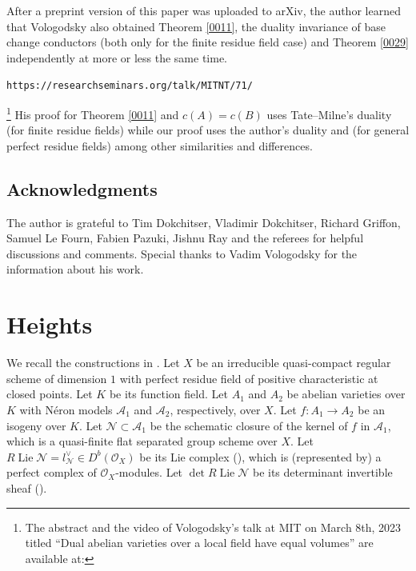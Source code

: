 \documentclass{amsart}
\theoremstyle{remark}
\numberwithin{equation}{section}
\newcommand{\Order}{\mathcal{O}}
\DeclareMathOperator{\Lie}{Lie}
\begin{document}
After a preprint version of this paper was uploaded to arXiv,
the author learned that Vologodsky also obtained
Theorem \ref{0011}, the duality invariance of base change conductors
(both only for the finite residue field case)
and Theorem \ref{0029}
independently at more or less the same time.%
\begin{lrbox}\myVerb%
    \footnotesize\verb|https://researchseminars.org/talk/MITNT/71/|%
\end{lrbox}%
\footnote{
    The abstract and the video of Vologodsky's talk at MIT
    on March 8th, 2023 titled
    ``Dual abelian varieties over a local field have equal volumes''
    are available at:
    \par\noindent
    \usebox\myVerb
}
His proof for Theorem \ref{0011} and $c(A) = c(B)$ uses
Tate--Milne's duality (for finite residue fields)
while our proof uses the author's duality \cite{Suz20a} and \cite{Suz20b}
(for general perfect residue fields) among other similarities and differences.


\subsection{Acknowledgments}

The author is grateful to
Tim Dokchitser, Vladimir Dokchitser,
Richard Griffon, Samuel Le Fourn, Fabien Pazuki,
Jishnu Ray and the referees
for helpful discussions and comments.
Special thanks to Vadim Vologodsky for the information about his work.


\section{Heights}

We recall the constructions in \cite[Sections 4, 5, 8 and 9]{GRS24}.
Let $X$ be an irreducible quasi-compact regular scheme of dimension $1$
with perfect residue field of positive characteristic at closed points.
Let $K$ be its function field.
Let $A_{1}$ and $A_{2}$ be abelian varieties over $K$
with N\'eron models $\mathcal{A}_{1}$ and $\mathcal{A}_{2}$,
respectively, over $X$.
Let $f \colon A_{1} \to A_{2}$ be an isogeny over $K$.
Let $\mathcal{N} \subset \mathcal{A}_{1}$ be
the schematic closure of the kernel of $f$ in $\mathcal{A}_{1}$,
which is a quasi-finite flat separated group scheme over $X$.
Let $R \Lie \mathcal{N} = l^{\vee}_{\mathcal{N}} \in D^{b}(\Order_{X})$ be
its Lie complex (\cite[Chapter VII, Section 3.1.1]{Ill72}),
which is (represented by) a perfect complex of $\Order_{X}$-modules.
Let $\det R \Lie \mathcal{N}$ be its determinant invertible sheaf
(\cite[Tag 0FJW]{Sta25}).
\end{document}
